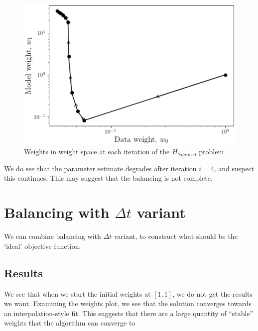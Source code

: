 \begin{figure}
\centering
\includegraphics{img/balance_weight_space.png}
\caption{Weights in weight space at each iteration of the
\(H_{balanced}\) problem}
\end{figure}

We do see that the parameter estimate degrades after iteration \(i=4\),
and suspect this continues. This may suggest that the balancing is not
complete.

\hypertarget{balancing-with-delta-t-variant}{%
\section{\texorpdfstring{Balancing with \(\Delta t\)
variant}{Balancing with \textbackslash{}Delta t variant}}\label{balancing-with-delta-t-variant}}

We can combine balancing with \(\Delta t\) variant, to construct what
should be the `ideal' objective function.

\hypertarget{results-3}{%
\subsection{Results}\label{results-3}}

We see that when we start the initial weights at \([1,1]\), we do not
get the results we want. Examining the weights plot, we see that the
solution converges towards an interpolation-style fit. This suggests
that there are a large quantity of ``stable'' weights that the algorithm
can converge to
